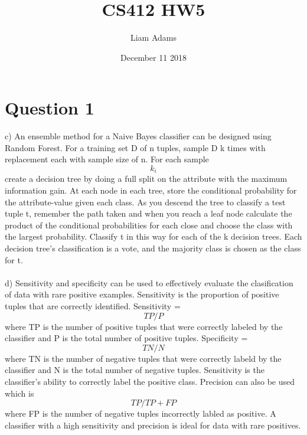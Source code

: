 \documentclass{article}
\title{CS412 HW5}
\author{Liam Adams }
\date{December 11 2018}
\begin{document}
\maketitle

\section{Question 1}


c) An ensemble method for a Naive Bayes classifier can be designed using Random Forest.  For a training set D of n tuples, sample D k times with replacement 
each with sample size of n.  For each sample $$k_i$$ create a decision tree by doing a full split on the attribute with the maximum information gain.
At each node in each tree, store the conditional probability for the attribute-value given each class.  As you descend the tree to classify a test tuple t, remember the path taken
and when you reach a leaf node calculate the product of the conditional probabilities for each close and choose the class with the largest probability.
Classify t in this way for each of the k decision trees.  Each decision tree's classification is a vote, and the majority class is chosen as the class for t.\\\\
d) Sensitivity and specificity can be used to effectively evaluate the clasification of data with rare positive examples.  Sensitivity is the proportion
of positive tuples that are correctly identified.  Sensitivity = $$TP/P$$ where TP is the number of positive tuples that were correctly labeled by the classifier
 and P is the total number of positive tuples.  Specificity = $$TN/N$$ where TN is the number of negative tuples that were correctly labeld by the classifier
  and N is the total number of negative tuples. Sensitivity is the classifier's ability to correctly label the positive class.
Precision can also be used which is $$TP/TP + FP$$ where FP is the number of negative tuples incorrectly labled as positive.  A classifier with a high
sensitivity and precision is ideal for data with rare positives.\\\\
\end{document}
